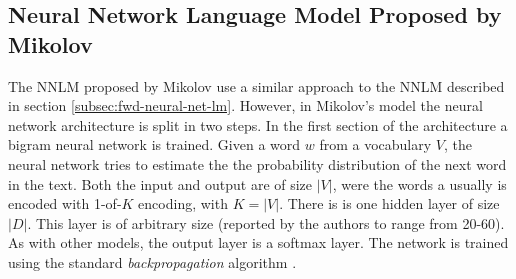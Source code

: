 





\subsection{Neural Network Language Model Proposed by Mikolov}
\label{sec:mikolov-neural-net-model}



The \ac{NNLM} proposed by Mikolov use a similar  approach to the
\ac{NNLM} described  in section \ref{subsec:fwd-neural-net-lm}. However, in  Mikolov's  model  the neural
network architecture is split in two steps. In the first section of  the
architecture  a bigram  neural network is trained. Given a word $w$ from a vocabulary $V$, the neural
network tries to estimate the the probability distribution of the next word
in the text. Both the input and output are of size $|V|$, were the words a
usually is encoded with 1-of-$K$ encoding, with $K=|V|$.  There is is one hidden layer of
size $|D|$. This layer is of  arbitrary size (reported by the authors  to
range from 20-60). As with other models, the output layer  is a  softmax
layer. The network is trained  using the standard \textit{backpropagation}
algorithm \cite{conf/icassp/MikolovKBGC09}. 

